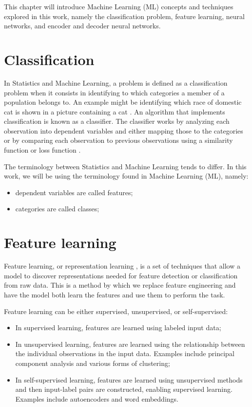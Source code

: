 
This chapter will introduce Machine Learning (ML) concepts and techniques explored in this work, namely the classification problem, feature learning, neural networks, and encoder and decoder neural networks.

\section{Classification}

In Statistics and Machine Learning, a problem is defined as a classification problem when it consists in identifying to which categories a member of a population belongs to. An example might be identifying which race of domestic cat is shown in a picture containing a cat \cite{Kolla2020}. An algorithm that implements classification is known as a classifier. The classifier works by analyzing each observation into dependent variables and either mapping those to the categories or by comparing each observation to previous observations using a similarity function or loss function \cite{lorena2021inteligencia}. 

The terminology between Statistics and Machine Learning tends to differ. In this work, we will be using the terminology found in Machine Learning (ML), namely:

\begin{itemize}
	\item dependent variables are called features;
	\item categories are called classes;
\end{itemize}


\section{Feature learning} \label{sec:feature_learning}

Feature learning, or representation learning \cite{RepLearning}, is a set of techniques that allow a model to discover representations needed for feature detection or classification from raw data. This is a method by which we replace feature engineering and have the model both learn the features and use them to perform the task.

Feature learning can be either supervised, unsupervised, or self-supervised:

\begin{itemize}
	\item In supervised learning, features are learned using labeled input data;
	\item In unsupervised learning, features are learned using the relationship between the individual observations in the input data. Examples include principal component analysis and various forms of clustering;
	\item In self-supervised learning, features are learned using unsupervised methods and then input-label pairs are constructed, enabling supervised learning. Examples include autoencoders and word embeddings.
\end{itemize}	

